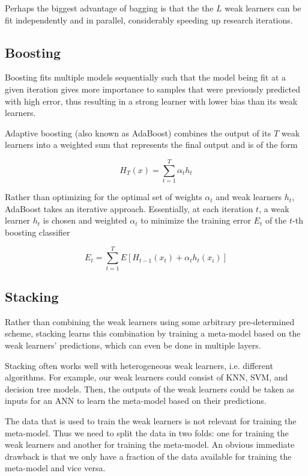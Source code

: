 Perhaps the biggest advantage of bagging is that the the $L$ weak learners can be fit independently and in parallel, considerably speeding up research iterations.

\subsection{Boosting}

Boosting fits multiple models sequentially such that the model being fit at a given iteration gives more importance to samples that were previously predicted with high error, thus resulting in a strong learner with lower bias than its weak learners.

Adaptive boosting (also known as AdaBoost) \cite{adaboost} combines the output of its $T$ weak learners into a weighted sum that represents the final output and is of the form

$$
H_T(x) = \sum_{t=1}^{T} \alpha_t h_t
$$

Rather than optimizing for the optimal set of weights $\alpha_t$ and weak learners $h_t$, AdaBoost takes an iterative approach. Essentially, at each iteration $t$, a weak learner $h_t$ is chosen and weighted $\alpha_t$ to minimize the training error $E_t$ of the $t$-th boosting classifier

$$
E_t = \sum_{t=1}^{T} E[H_{t-1}(x_t) + \alpha_t h_t(x_i)]
$$

\subsection{Stacking}

Rather than combining the weak learners using some arbitrary pre-determined scheme, stacking learns this combination by training a meta-model based on the weak learners' predictions, which can even be done in multiple layers.

Stacking often works well with heterogeneous weak learners, i.e. different algorithms. For example, our weak learners could consist of \ac{KNN}, \ac{SVM}, and decision tree models. Then, the outputs of the weak learners could be taken as inputs for an \ac{ANN} to learn the meta-model based on their predictions.

The data that is used to train the weak learners is not relevant for training the meta-model. Thus we need to split the data in two folds: one for training the weak learners and another for training the meta-model. An obvious immediate drawback is that we only have a fraction of the data available for training the meta-model and vice versa.

